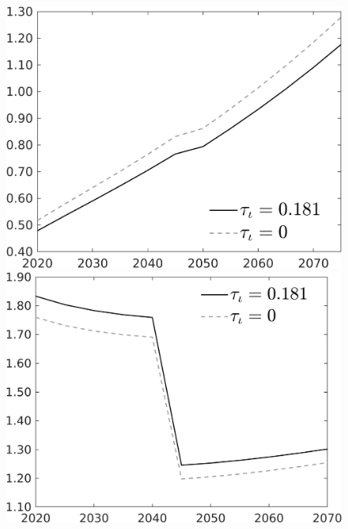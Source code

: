 \documentclass[12pt]{article}
\begin{document}
\begin{figure}[h!!]
\begin{minipage}[]{0.32\textwidth}
	\end{minipage}	
	\begin{minipage}[]{0.32\textwidth}
		\includegraphics[width=1\textwidth]{../../codding_model/own_basedOnFried/optimalPol_010922_revision/figures/all_13Sept22/CompTauf_bytaul_Equlab_Reg0_C_spillover0_nsk0_xgr0_knspil0_sep1_LFlimit1_emsbase0_countec0_GovRev0_etaa0.79_lgd1.png}
	\end{minipage}	
	\begin{minipage}[]{0.32\textwidth}
		\includegraphics[width=1\textwidth]{../../codding_model/own_basedOnFried/optimalPol_010922_revision/figures/all_13Sept22/CompTauf_bytaul_Equlab_Reg0_gAf_spillover0_nsk0_xgr0_knspil0_sep1_LFlimit1_emsbase0_countec0_GovRev0_etaa0.79_lgd1.png}

\end{minipage}
\end{figure}
\end{document}
